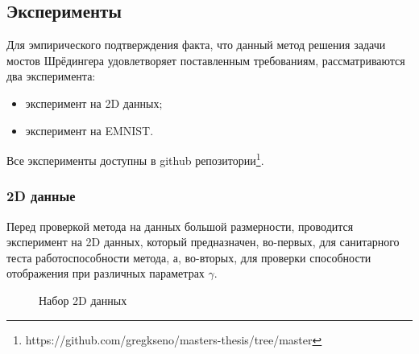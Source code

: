 
\subsection{Эксперименты}
Для эмпирического подтверждения факта, что данный метод решения задачи мостов Шрёдингера удовлетворяет поставленным требованиям, рассматриваются два эксперимента:
\begin{itemize}
    \item эксперимент на 2D данных;
    \item эксперимент на EMNIST.
\end{itemize}
Все эксперименты доступны в github репозитории\footnote{https://github.com/gregkseno/masters-thesis/tree/master}.

\subsubsection{2D данные}
Перед проверкой метода на данных большой размерности, проводится эксперимент на 2D данных, который предназначен, во-первых, для санитарного теста работоспособности метода, а, во-вторых, для проверки способности отображения при различных параметрах $\gamma$.

\begin{figure}
    \centering
    \hfill
    \caption{Набор 2D данных}
    \label{fig:moons-circles}
\end{figure}

